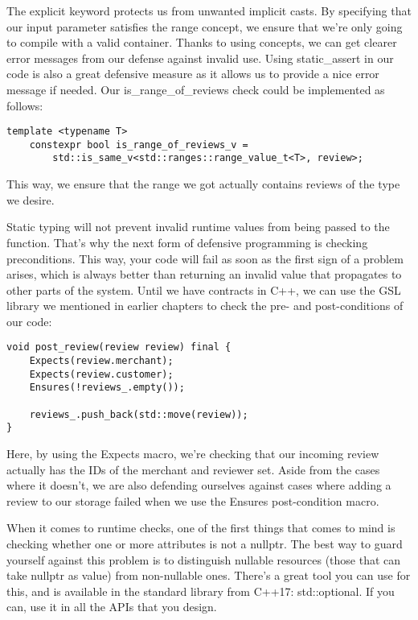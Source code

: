 The explicit keyword protects us from unwanted implicit casts. By specifying that our input parameter satisfies the range concept, we ensure that we're only going to compile with a valid container. Thanks to using concepts, we can get clearer error messages from our defense against invalid use. Using static\_assert in our code is also a great defensive measure as it allows us to provide a nice error message if needed. Our is\_range\_of\_reviews check could be implemented as follows:

\begin{lstlisting}[style=styleCXX]
template <typename T>
	constexpr bool is_range_of_reviews_v =
		std::is_same_v<std::ranges::range_value_t<T>, review>;
\end{lstlisting}

This way, we ensure that the range we got actually contains reviews of the type we desire.

Static typing will not prevent invalid runtime values from being passed to the function. That's why the next form of defensive programming is checking preconditions. This way, your code will fail as soon as the first sign of a problem arises, which is always better than returning an invalid value that propagates to other parts of the system. Until we have contracts in C++, we can use the GSL library we mentioned in earlier chapters to check the pre- and post-conditions of our code:

\begin{lstlisting}[style=styleCXX]
void post_review(review review) final {
	Expects(review.merchant);
	Expects(review.customer);
	Ensures(!reviews_.empty());
	
	reviews_.push_back(std::move(review));
}
\end{lstlisting}

Here, by using the Expects macro, we're checking that our incoming review actually has the IDs of the merchant and reviewer set. Aside from the cases where it doesn't, we are also defending ourselves against cases where adding a review to our storage failed when we use the Ensures post-condition macro.

When it comes to runtime checks, one of the first things that comes to mind is checking whether one or more attributes is not a nullptr. The best way to guard yourself against this problem is to distinguish nullable resources (those that can take nullptr as value) from non-nullable ones. There's a great tool you can use for this, and is available in the standard library from C++17: std::optional. If you can, use it in all the APIs that you design.

